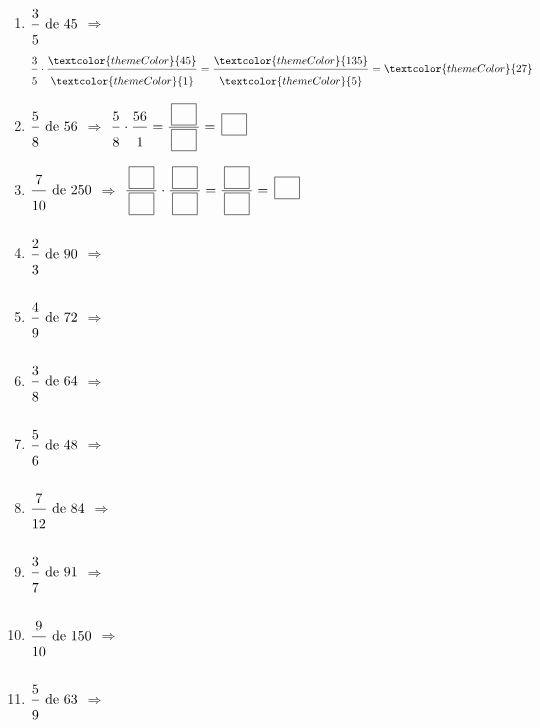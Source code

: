 \begin{enumerate}[leftmargin=*,align=parleft, label=\alph*), itemsep=9pt]
\item $\FA{3}{5}\text{ de }45$ \quad $\Longrightarrow$ \quad $\FA{3}{5}\cdot\FA{\textcolor{themeColor}{45}}{\textcolor{themeColor}{1}}=\FA{\textcolor{themeColor}{135}}{\textcolor{themeColor}{5}}=\textcolor{themeColor}{27}$
\item $\FA{5}{8}\text{ de }56$ \quad $\Longrightarrow$ \quad $\FA{5}{8}\cdot\FA{56}{1}=\FA{\CaseC}{\CaseC}=\CaseC$
\item $\FA{7}{10}\text{ de }250$ \quad $\Longrightarrow$ \quad $\FA{\CaseC}{\CaseC}\cdot\FA{\CaseC}{\CaseC}=\FA{\CaseC}{\CaseC}=\CaseC$
\item $\FA{2}{3}\text{ de }90$ \quad $\Longrightarrow$
\item $\FA{4}{9}\text{ de }72$ \quad $\Longrightarrow$
\item $\FA{3}{8}\text{ de }64$ \quad $\Longrightarrow$
\item $\FA{5}{6}\text{ de }48$ \quad $\Longrightarrow$
\item $\FA{7}{12}\text{ de }84$ \quad $\Longrightarrow$
\item $\FA{3}{7}\text{ de }91$ \quad $\Longrightarrow$
\item $\FA{9}{10}\text{ de }150$ \quad $\Longrightarrow$
\item $\FA{5}{9}\text{ de }63$ \quad $\Longrightarrow$
\end{enumerate}
 
\newpage
{}
 
